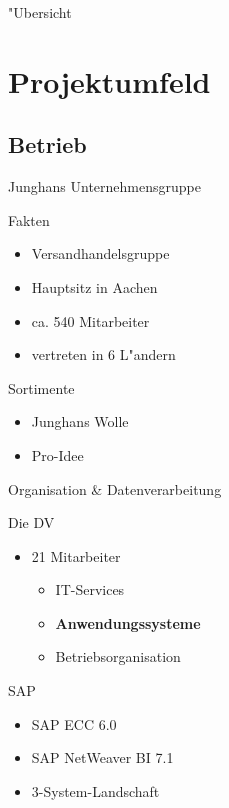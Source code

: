 \setcounter{figure}{0}

\begin{frame}{"Ubersicht}
  \tableofcontents
\end{frame}

\section{Projektumfeld}

\subsection{Betrieb}
\begin{frame}[<+->]{Junghans Unternehmensgruppe}
			\begin{block}{Fakten}
				\begin{itemize}[<+->]
						\item Versandhandelsgruppe
						\item Hauptsitz in Aachen
						\item ca. 540 Mitarbeiter
						\item vertreten in 6 L"andern
				\end{itemize}
			\end{block}

			\begin{block}{Sortimente}
				\begin{itemize}[<+->]
						\item Junghans Wolle
						\item Pro-Idee
				\end{itemize}
			\end{block}
\end{frame}

\begin{frame}[<+->]{Organisation \& Datenverarbeitung}
			\begin{block}{Die DV}
				\begin{itemize}
						\item 21 Mitarbeiter
						\begin{itemize}
							\item IT-Services
							\item \textbf<6>{Anwendungssysteme}
							\item Betriebsorganisation
						\end{itemize}
				\end{itemize}
			\end{block}
			\pause
			\begin{block}{SAP}
				\begin{itemize}[<+->]
						\item SAP ECC 6.0
						\item SAP NetWeaver BI 7.1
						\item 3-System-Landschaft
				\end{itemize}
			\end{block}
\end{frame}


